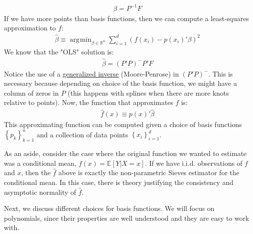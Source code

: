 \documentclass[12pt, a4paper]{article}
\newcommand{\E}[1]{\mathbb{E}{\left[#1\right]}}
\newcommand{\Set}[1]{\left\{#1\right\}}
\DeclareMathOperator*{\argmin}{\arg\!\min}
\begin{document}
\begin{align*}
\beta=P^{-1}F
\end{align*}
If we have more points than basis functions, then we can compute a least-squares approximation to \(f\):
\begin{align*}
\hat{\beta} \equiv \argmin_{\beta\in\mathbb{R}^n}{\sum_{i=1}^d(f(x_i) - p(x_i)'\beta)^2}
\end{align*}
We know that the "OLS" solution is:
\begin{align*}
\hat{\beta}=(P'P)^{-}P'F
\end{align*}
Notice the use of a \href{https://en.wikipedia.org/wiki/Moore–Penrose\_inverse}{generalized inverse} (Moore-Penrose) in \((P'P)^{-}\).
This is necessary because depending on choice of the basis function, we might have a column of zeros in \(P\) (this happens with splines when there are more knots relative to points).
Now, the function that approximates \(f\) is:
\begin{align*}
\hat{f}(x) \equiv p(x)'\hat{\beta}
\end{align*}
This approximating function can be computed given a choice of basis functions \(\Set{p_k}_{k=1}^n\) and a collection of data points \(\Set{x_i}_{i=1}^d\).

As an aside, consider the case where the original function we wanted to estimate was a conditional mean, \(f(x)=\E{Y\vert X=x}\).
If we have i.i.d. observations of \(f\) and \(x\), then the \(\hat{f}\) above is exactly the non-parametric Sieves estimator for the conditional mean.
In this case, there is theory justifying the consistency and asymptotic normality of \(\hat{f}\).

Next, we discuss different choices for basis functions.
We will focus on polynomials, since their properties are well understood and they are easy to work with.
\end{document}
